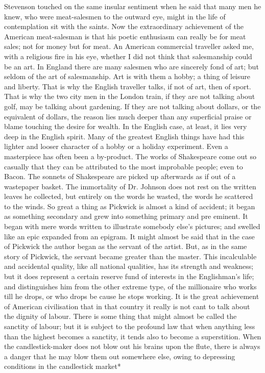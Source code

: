 \documentclass{book}
\begin{document}
Stevenson touched on the same insular sentiment when he said that many men he knew, who were meat-salesmen to the outward eye, might in the life of contemplation sit with the saints. Now the extraordinary achievement of the American meat-salesman is that his poetic enthusiasm can really be for meat sales; not for money but for meat. An American commercial traveller asked me, with a religious fire in his eye, whether I did not think that salesmanship could be an art. In England there are many salesmen who are sincerely fond of art; but seldom of the art of salesmanship. Art is with them a hobby; a thing of leisure and liberty. That is why the English traveller talks, if not of art, then of sport. That is why the two city men in the London train, if they are not talking about golf, may be talking about gardening. If they are not talking about dollars, or the equivalent of dollars, the reason lies much deeper than any superficial praise or blame touching the desire for wealth. In the English case, at least, it lies very deep in the English spirit. Many of the greatest English things have had this lighter and looser character of a hobby or a holiday experiment. Even a masterpiece has often been a by-product. The works of Shakespeare come out so casually that they can be attributed to the most improbable people; even to Bacon. The sonnets of Shakespeare are picked up afterwards as if out of a wastepaper basket. The immortality of Dr. Johnson does not rest on the written leaves he collected, but entirely on the words he wasted, the words he scattered to the winds. So great a thing as Pickwick is almost a kind of accident; it began as something secondary and grew into something primary and pre eminent. It began with mere words written to illustrate somebody else’s pictures; and swelled like an epic expanded from an epigram. It might almost be said that in the case of Pickwick the author began as the servant of the artist. But, as in the same story of Pickwick, the servant became greater than the master. This incalculable and accidental quality, like all national qualities, has its strength and weakness; but it does represent a certain reserve fund of interests in the Englishman’s life; and distinguishes him from the other extreme type, of the millionaire who works till he drops, or who drops be cause he stops working. It is the great achievement of American civilisation that in that country it really is not cant to talk about the dignity of labour. There is some thing that might almost be called the sanctity of labour; but it is subject to the profound law that when anything less than the highest becomes a sanctity, it tends also to become a superstition. When the candlestick-maker does not blow out his brains upon the flute, there is always a danger that he may blow them out somewhere else, owing to depressing conditions in the candlestick market*
\end{document}
